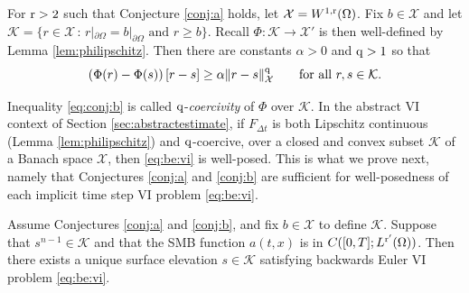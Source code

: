 \documentclass[hidelinks,onefignum,onetabnum,final]{siamart220329}  %
\newcommand{\cK}{\mathcal{K}}
\newcommand{\cX}{\mathcal{X}}
\newcommand{\qq}{{\text{\textnormal{q}}}}
\newcommand{\rr}{{\text{\textnormal{r}}}}
\begin{document}
\begin{conjecture} \label{conj:b}  For $\rr>2$ such that Conjecture \ref{conj:a} holds, let $\cX = W^{1,\rr}(\Omega)$.  Fix $b\in\cX$ and let $\cK=\{r\in\cX\,:\,r|_{\partial\Omega}=b|_{\partial\Omega} \text{ and } r\ge b\}$.  Recall $\Phi:\cK\to\cX'$ is then well-defined by Lemma \ref{lem:philipschitz}.  Then there are constants $\alpha>0$ and $\qq>1$ so that
\begin{equation}
\left(\Phi(r) - \Phi(s)\right)[r-s] \ge \alpha \|r-s\|_{\cX}^\qq \qquad \text{for all } r,s\in\cK. \label{eq:conj:b}
\end{equation}
\end{conjecture}

Inequality \eqref{eq:conj:b} is called $\qq$-\emph{coercivity} of $\Phi$ over $\cK$.  In the abstract VI context of Section \ref{sec:abstractestimate}, if $F_{\Delta t}$ is both Lipschitz continuous (Lemma \ref{lem:philipschitz}) and $\qq$-coercive, over a closed and convex subset $\cK$ of a Banach space $\cX$, then \eqref{eq:be:vi} is well-posed.  This is what we prove next, namely that Conjectures \ref{conj:a} and \ref{conj:b} are sufficient for well-posedness of each implicit time step VI problem \eqref{eq:be:vi}.

\begin{theorem} \label{thm:stepwellposed}  Assume Conjectures \ref{conj:a} and \ref{conj:b}, and fix $b \in \cX$ to define $\cK$.  Suppose that $s^{n-1}\in\cK$ and that the SMB function $a(t,x)$ is in $C([0,T]; L^{\rr'}(\Omega))$.  Then there exists a unique surface elevation $s\in\cK$ satisfying backwards Euler VI problem \eqref{eq:be:vi}. \end{theorem}
\end{document}
